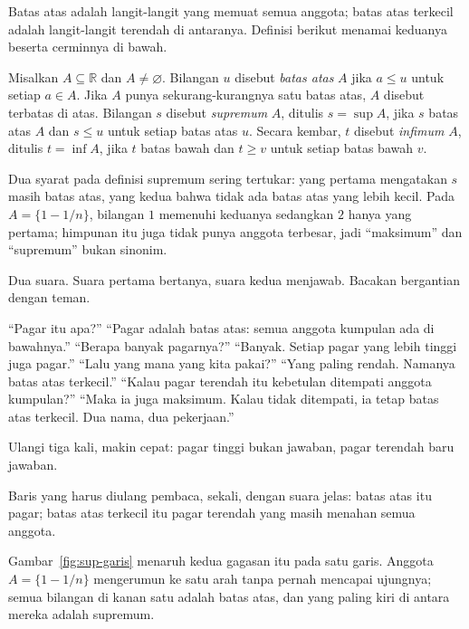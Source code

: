 Batas atas adalah langit-langit yang memuat semua anggota; batas atas terkecil adalah
langit-langit terendah di antaranya. Definisi berikut menamai keduanya beserta cerminnya
di bawah.

\begin{definisi}
Misalkan $A\subseteq\mathbb{R}$ dan $A\neq\varnothing$. Bilangan $u$ disebut
\emph{batas atas} $A$ jika $a\le u$ untuk setiap $a\in A$. Jika $A$ punya
sekurang-kurangnya satu batas atas, $A$ disebut terbatas di atas. Bilangan $s$ disebut
\emph{supremum} $A$, ditulis $s=\sup A$, jika $s$ batas atas $A$ dan $s\le u$ untuk
setiap batas atas $u$. Secara kembar, $t$ disebut \emph{infimum} $A$, ditulis
$t=\inf A$, jika $t$ batas bawah dan $t\ge v$ untuk setiap batas bawah $v$.
\end{definisi}

Dua syarat pada definisi supremum sering tertukar: yang pertama mengatakan $s$ masih
batas atas, yang kedua bahwa tidak ada batas atas yang lebih kecil. Pada $A=\{1-1/n\}$,
bilangan $1$ memenuhi keduanya sedangkan $2$ hanya yang pertama; himpunan itu juga tidak
punya anggota terbesar, jadi ``maksimum'' dan ``supremum'' bukan sinonim.

\begin{bacakeras}
Dua suara. Suara pertama bertanya, suara kedua menjawab. Bacakan bergantian dengan teman.

``Pagar itu apa?'' ``Pagar adalah batas atas: semua anggota kumpulan ada di bawahnya.''
``Berapa banyak pagarnya?'' ``Banyak. Setiap pagar yang lebih tinggi juga pagar.''
``Lalu yang mana yang kita pakai?'' ``Yang paling rendah. Namanya batas atas terkecil.''
``Kalau pagar terendah itu kebetulan ditempati anggota kumpulan?'' ``Maka ia juga maksimum.
Kalau tidak ditempati, ia tetap batas atas terkecil. Dua nama, dua pekerjaan.''

Ulangi tiga kali, makin cepat: pagar tinggi bukan jawaban, pagar terendah baru jawaban.

Baris yang harus diulang pembaca, sekali, dengan suara jelas: batas atas itu pagar; batas
atas terkecil itu pagar terendah yang masih menahan semua anggota.
\end{bacakeras}

Gambar~\ref{fig:sup-garis} menaruh kedua gagasan itu pada satu garis. Anggota
$A=\{1-1/n\}$ mengerumun ke satu arah tanpa pernah mencapai ujungnya; semua bilangan di
kanan satu adalah batas atas, dan yang paling kiri di antara mereka adalah supremum.


